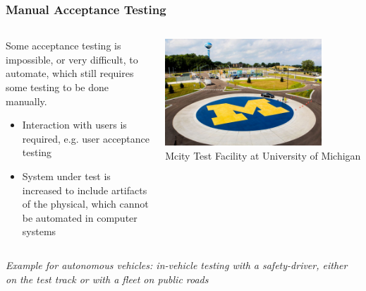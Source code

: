 \begin{frame}
\frametitle{Manual Acceptance Testing}
\begin{columns}[]
    \begin{column}{0.55\textwidth}
        Some acceptance testing is impossible, or very difficult, to automate,
        which still requires some testing to be done manually.\\
        \begin{itemize}
            \item Interaction with users is required, e.g. user acceptance testing
            \item System under test is increased to include artifacts of the
                physical, which cannot be automated in computer systems
        \end{itemize}
    \end{column}
    \begin{column}{0.45\textwidth}
        \centering
        \includegraphics[width=0.8\textwidth]{images/m-city.jpg}\\
        \footnotesize{Mcity Test Facility at University of Michigan\footnotemark[1]}
    \end{column}
\end{columns}
\vspace{0.25cm}
\emph{Example for autonomous vehicles: in-vehicle testing with a safety-driver,
either on the test track or with a fleet on public roads}
\end{frame}

